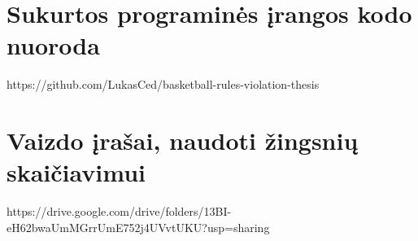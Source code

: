 \documentclass{VUMIFPSbakalaurinis}
\begin{document}
\appendix  %

\section{Sukurtos programinės įrangos kodo nuoroda}
https://github.com/LukasCed/basketball-rules-violation-thesis

\section{Vaizdo įrašai, naudoti žingsnių skaičiavimui}
https://drive.google.com/drive/folders/13BI-eH62bwaUmMGrrUmE752j4UVvtUKU?usp=sharing
\end{document}
